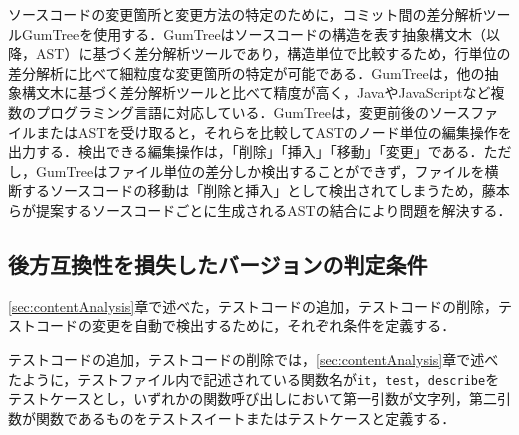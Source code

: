 \documentclass[submit]{ipsj}
\begin{document}
{ソースコードの変更箇所と変更方法の特定のために，コミット間の差分解析ツールGumTree\cite{gumtree}を使用する．GumTreeはソースコードの構造を表す抽象構文木（以降，AST）に基づく差分解析ツールであり，構造単位で比較するため，行単位の差分解析に比べて細粒度な変更箇所の特定が可能である．GumTreeは，他の抽象構文木に基づく差分解析ツール\cite{diff-1}\cite{diff-2}\cite{diff-3}と比べて精度が高く，JavaやJavaScriptなど複数のプログラミング言語に対応している．GumTreeは，変更前後のソースファイルまたはASTを受け取ると，それらを比較してASTのノード単位の編集操作を出力する．検出できる編集操作は，「削除」「挿入」「移動」「変更」である．ただし，GumTreeはファイル単位の差分しか検出することができず，ファイルを横断するソースコードの移動は「削除と挿入」として検出されてしまうため，藤本ら\cite{gumtreenoyatu}が提案するソースコードごとに生成されるASTの結合により問題を解決する．



\vspace{-2mm}
\subsection{後方互換性を損失したバージョンの判定条件}\label{subsec:rq2.jouken}
\ref{sec:contentAnalysis}章で述べた，テストコードの追加，テストコードの削除，テストコードの変更を自動で検出するために，それぞれ条件を定義する．

テストコードの追加，テストコードの削除では，\ref{sec:contentAnalysis}章で述べたように，テストファイル内で記述されている関数名が{\verb|it|}，{\verb|test|}，{\verb|describe|}をテストケースとし，いずれかの関数呼び出しにおいて第一引数が文字列，第二引数が関数であるものをテストスイートまたはテストケースと定義する．

}
\end{document}
